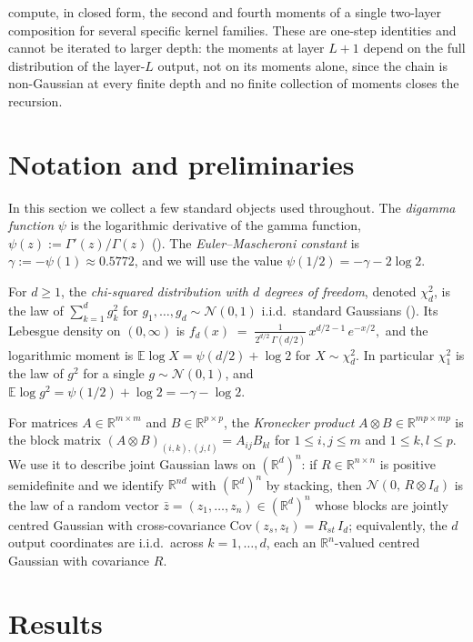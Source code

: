 \documentclass{article}
\newcommand{\RR}{\mathbb{R}}
\newcommand{\Exp}[1]{\mathbb{E} #1}
\newcommand{\mcN}{\mathcal{N}}
\newcommand{\bz}{\bar{z}}
\newcommand{\Cov}{\mathrm{Cov}}
\begin{document}
\citet{lu2019interpretable} compute, in closed form, the second and fourth moments of a single two-layer composition for several specific kernel families. These are one-step identities and cannot be iterated to larger depth: the moments at layer $L+1$ depend on the full distribution of the layer-$L$ output, not on its moments alone, since the chain is non-Gaussian at every finite depth and no finite collection of moments closes the recursion.

\section{Notation and preliminaries}
\label{sec:definitions}

In this section we collect a few standard objects used throughout. The \emph{digamma function} $\psi$ is the logarithmic derivative of the gamma function, $\psi(z) := \Gamma'(z) / \Gamma(z)$ (\cite{abramowitz1964handbook}). The \emph{Euler--Mascheroni constant} is $\gamma := -\psi(1) \approx 0.5772$, and we will use the value $\psi(1/2) = -\gamma - 2\log 2$.

For $d \ge 1$, the \emph{chi-squared distribution with $d$ degrees of freedom}, denoted $\chi^2_d$, is the law of $\sum_{k=1}^d g_k^2$ for $g_1, \ldots, g_d \sim \mcN(0, 1)$ i.i.d.\ standard Gaussians (\cite{abramowitz1964handbook}). Its Lebesgue density on $(0, \infty)$ is
 $ f_d(x) \;=\; \frac{1}{2^{d/2}\,\Gamma(d/2)}\, x^{d/2 - 1}\, e^{-x/2},$
and the logarithmic moment is $\Exp{\log X} = \psi(d/2) + \log 2$ for $X \sim \chi^2_d$. In particular $\chi^2_1$ is the law of $g^2$ for a single $g \sim \mcN(0,1)$, and $\Exp{\log g^2} = \psi(1/2) + \log 2 = -\gamma - \log 2$.

For matrices $A \in \RR^{m \times m}$ and $B \in \RR^{p \times p}$, the \emph{Kronecker product} $A \otimes B \in \RR^{mp \times mp}$ is the block matrix $(A \otimes B)_{(i,k),(j,l)} = A_{ij} B_{kl}$ for $1 \le i, j \le m$ and $1 \le k, l \le p$. We use it to describe joint Gaussian laws on $(\RR^d)^n$: if $R \in \RR^{n \times n}$ is positive semidefinite and we identify $\RR^{nd}$ with $(\RR^d)^n$ by stacking, then $\mcN(0,\, R \otimes I_d)$ is the law of a random vector $\bz = (z_1, \ldots, z_n) \in (\RR^d)^n$ whose blocks are jointly centred Gaussian with cross-covariance $\Cov(z_s, z_t) = R_{st}\, I_d$; equivalently, the $d$ output coordinates are i.i.d.\ across $k = 1, \ldots, d$, each an $\RR^n$-valued centred Gaussian with covariance $R$.

\section{Results}
\label{sec:results}
\end{document}
